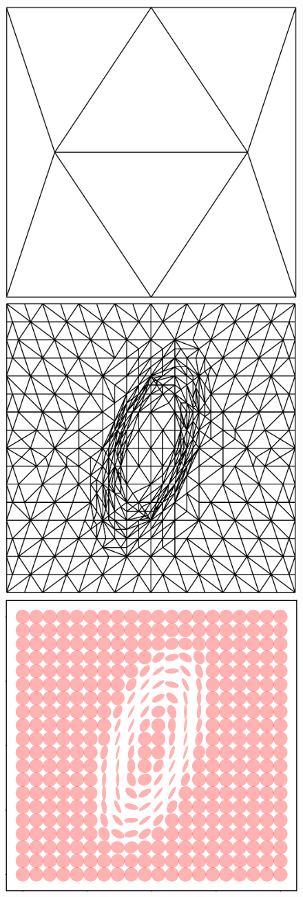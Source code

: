 \begin{figure}
    \centering
    \includegraphics[width=0.75\columnwidth]{../images/bell_before_refinement.png}
    \label{fig:bell_input}
    \includegraphics[width=0.75\columnwidth]{../images/bell_after_refinement.png}
    \includegraphics[width=0.75\columnwidth]{../images/bell_tissot.png}

\end{figure}
